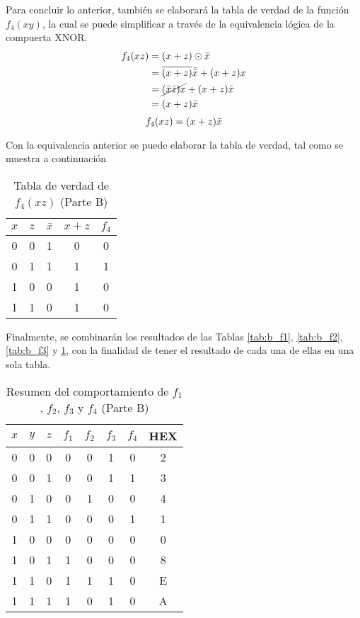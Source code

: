 \documentclass[../procedimientos.tex]{subfiles}
\begin{document}
Para concluir lo anterior, también se elaborará la tabla de verdad de la 
función $f_4(xy)$, la cual se puede simplificar a través de la equivalencia 
lógica de la compuerta XNOR.
\begin{align*}
  f_4(xz) &= (x + z) \odot \bar{x}\\
  &= \overline{(x+z)}\bar{\bar{x}} + (x+z)x\\
  &= \cancel{(\bar{x}\bar{z})x} + (x+z)\bar{x}\\
  &= (x+z)\bar{x}
\end{align*}
$$f_4(xz) = (x+z)\bar{x}$$

Con la equivalencia anterior se puede elaborar la tabla de verdad, tal como se 
muestra a continuación
\begin{table}[H]
  \centering
  \begin{tabular}{cc|cc|c}
    \hline
    $x$ & $z$ & $\bar{x}$ & $x+z$ & $f_4$\\
    \hline
    0 & 0 & 1 & 0 & 0\\
    0 & 1 & 1 & 1 & 1\\
    1 & 0 & 0 & 1 & 0\\
    1 & 1 & 0 & 1 & 0\\
    \hline
  \end{tabular}
  \caption{Tabla de verdad de $f_4(xz)$ (Parte B)}
  \label{tab:b_f4}
\end{table}

Finalmente, se combinarán los resultados de las Tablas \ref{tab:b_f1}, 
\ref{tab:b_f2}, \ref{tab:b_f3} y \ref{tab:b_f4}, con la finalidad de tener el 
resultado de cada una de ellas en una sola tabla.
\begin{table}[H]
  \centering
  \begin{tabular}{ccc|cccc|c}
    \hline
    $x$ & $y$ & $z$ & $f_1$ & $f_2$ & $f_3$ & $f_4$ & HEX\\
    \hline
    0 & 0 & 0 & 0 & 0 & 1 & 0 & 2\\
    0 & 0 & 1 & 0 & 0 & 1 & 1 & 3\\
    0 & 1 & 0 & 0 & 1 & 0 & 0 & 4\\
    0 & 1 & 1 & 0 & 0 & 0 & 1 & 1\\
    1 & 0 & 0 & 0 & 0 & 0 & 0 & 0\\
    1 & 0 & 1 & 1 & 0 & 0 & 0 & 8\\
    1 & 1 & 0 & 1 & 1 & 1 & 0 & E\\
    1 & 1 & 1 & 1 & 0 & 1 & 0 & A\\
    \hline
  \end{tabular}
  \caption{Resumen del comportamiento de $f_1$, $f_2$, $f_3$ y $f_4$ (Parte 
  B)}
  \label{tab:b_summary}
\end{table}
\end{document}
